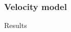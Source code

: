 \begin{frame}
   \begin{multicols}{2}
      {}
      {}
   \end{multicols}

\end{frame}
\begin{frame} \frametitle{Velocity model}
         {}
\end{frame}

\begin{frame} 
\begin{center}
 \Huge Results
\end{center}

\end{frame}


